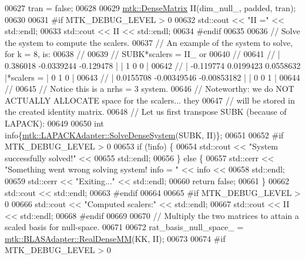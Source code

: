 \begin{DoxyCode}
{{00627   tran = \textcolor{keyword}{false};
00628 
00629   \hyperlink{classmtk_1_1DenseMatrix}{mtk::DenseMatrix} II(dim\_null\_, padded, tran);
00630 
00631 \textcolor{preprocessor}{  #if MTK\_DEBUG\_LEVEL > 0}
00632   std::cout << \textcolor{stringliteral}{"II ="} << std::endl;
00633   std::cout << II << std::endl;
00634 \textcolor{preprocessor}{  #endif}
00635 
00636   \textcolor{comment}{// Solve the system to compute the scalers.}
00637   \textcolor{comment}{// An example of the system to solve, for k = 8, is:}
00638   \textcolor{comment}{//}
00639   \textcolor{comment}{// SUBK*scalers = II\_ or}
00640   \textcolor{comment}{//}
00641   \textcolor{comment}{// |  0.386018  -0.0339244   -0.129478 |           | 1 0 0 |}
00642   \textcolor{comment}{// | -0.119774   0.0199423   0.0558632 |*scalers = | 0 1 0 |}
00643   \textcolor{comment}{// | 0.0155708 -0.00349546 -0.00853182 |           | 0 0 1 |}
00644   \textcolor{comment}{//}
00645   \textcolor{comment}{// Notice this is a nrhs = 3 system.}
00646   \textcolor{comment}{// Noteworthy: we do NOT ACTUALLY ALLOCATE space for the scalers... they}
00647   \textcolor{comment}{// will be stored in the created identity matrix.}
00648   \textcolor{comment}{// Let us first transpose SUBK (because of LAPACK):}
00649 
00650   \textcolor{keywordtype}{int} info\{\hyperlink{classmtk_1_1LAPACKAdapter_a7428bccf74fd4a4af68fb7233846da22}{mtk::LAPACKAdapter::SolveDenseSystem}(SUBK, II)\};
00651 
00652 \textcolor{preprocessor}{  #if MTK\_DEBUG\_LEVEL > 0}
00653   \textcolor{keywordflow}{if} (!info) \{
00654     std::cout << \textcolor{stringliteral}{"System successfully solved!"} <<
00655       std::endl;
00656   \} \textcolor{keywordflow}{else} \{
00657     std::cerr << \textcolor{stringliteral}{"Something went wrong solving system! info = "} << info <<
00658       std::endl;
00659     std::cerr << \textcolor{stringliteral}{"Exiting..."} << std::endl;
00660     \textcolor{keywordflow}{return} \textcolor{keyword}{false};
00661   \}
00662   std::cout << std::endl;
00663 \textcolor{preprocessor}{  #endif}
00664 
00665 \textcolor{preprocessor}{  #if MTK\_DEBUG\_LEVEL > 0}
00666   std::cout << \textcolor{stringliteral}{"Computed scalers:"} << std::endl;
00667   std::cout << II << std::endl;
00668 \textcolor{preprocessor}{  #endif}
00669 
00670   \textcolor{comment}{// Multiply the two matrices to attain a scaled basis for null-space.}
00671 
00672   rat\_basis\_null\_space\_ = \hyperlink{classmtk_1_1BLASAdapter_acebd0e9bfe0bdd609c7fbea98ccfd3b5}{mtk::BLASAdapter::RealDenseMM}(KK, II);
00673 
00674 \textcolor{preprocessor}{  #if MTK\_DEBUG\_LEVEL > 0}
}}
\end{DoxyCode}
